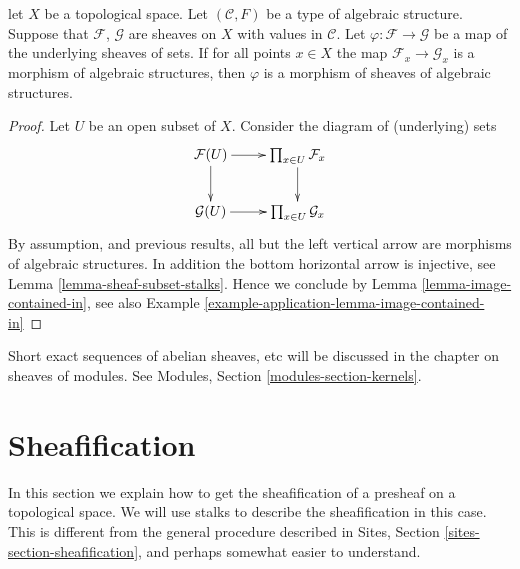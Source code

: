 \begin{lemma}
\label{lemma-check-homomorphism-stalks}
let $X$ be a topological space.
Let $(\mathcal{C}, F)$ be a type of algebraic structure.
Suppose that $\mathcal{F}$, $\mathcal{G}$ are sheaves on $X$
with values in $\mathcal{C}$.
Let $\varphi : \mathcal{F} \to \mathcal{G}$
be a map of the underlying sheaves of sets.
If for all points $x \in X$ the map
$\mathcal{F}_x \to \mathcal{G}_x$
is a morphism of algebraic structures,
then $\varphi$ is a morphism of sheaves of algebraic structures.
\end{lemma}

\begin{proof}
Let $U$ be an open subset of $X$. Consider the diagram of
(underlying) sets
$$
\xymatrix{
\mathcal{F}(U) \ar[r] \ar[d] &
\prod_{x \in U} \mathcal{F}_x \ar[d] \\
\mathcal{G}(U) \ar[r] &
\prod_{x \in U} \mathcal{G}_x
}
$$
By assumption, and previous results, all but the left vertical
arrow are morphisms of algebraic structures. In addition the
bottom horizontal arrow is injective,
see Lemma \ref{lemma-sheaf-subset-stalks}.
Hence we conclude by Lemma \ref{lemma-image-contained-in},
see also Example \ref{example-application-lemma-image-contained-in}
\end{proof}

\noindent
Short exact sequences of abelian sheaves, etc will be discussed
in the chapter on sheaves of modules. See
Modules, Section \ref{modules-section-kernels}.




\section{Sheafification}
\label{section-sheafification}

\noindent
In this section we explain how to get the sheafification
of a presheaf on a topological space. We will use stalks
to describe the sheafification in this case. This is different
from the general procedure described in Sites, Section
\ref{sites-section-sheafification}, and perhaps somewhat
easier to understand.

